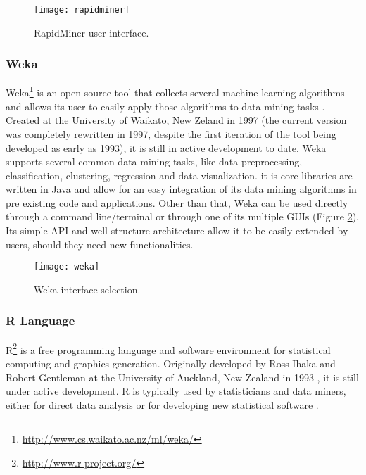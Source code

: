 \begin{figure}[!htb]
  \begin{center}
    \leavevmode
    \texttt{[image: rapidminer]}
    \caption[RapidMiner user interface]{RapidMiner user interface.}
    \label{fig:rapidminer}
  \end{center}
\end{figure}

\subsubsection*{Weka}

Weka\footnote{\url{http://www.cs.waikato.ac.nz/ml/weka/}} is an open source tool that
collects several machine learning algorithms and allows its user to easily apply
those algorithms to data mining tasks \cite{Hall}. Created at the University of
Waikato, New Zeland in 1997 (the current version was completely rewritten in
1997, despite the first iteration of the tool being developed as early as 1993),
it is still in active development to date. Weka supports several common data
mining tasks, like data preprocessing, classification, clustering, regression
and data visualization. it is core libraries are written in Java and allow for an
easy integration of its data mining algorithms in pre existing code and
applications. Other than that, Weka can be used directly through a command
line/terminal or through one of its multiple GUIs (Figure \ref{fig:weka}). Its
simple API and well structure architecture allow it to be easily extended by
users, should they need new functionalities.

\begin{figure}[!htb]
  \begin{center}
    \leavevmode
    \texttt{[image: weka]}
    \caption[Weka interface selection]{Weka interface selection.}
    \label{fig:weka}
  \end{center}
\end{figure}

\subsubsection*{R Language}

R\footnote{\url{http://www.r-project.org/}} is a free programming language and
software environment for statistical computing and graphics generation.
Originally developed by Ross Ihaka and Robert Gentleman at the University of
Auckland, New Zealand in 1993 \cite{Ihaka1998}, it is still under active
development. R is typically used by statisticians and data miners, either for
direct data analysis or for developing new statistical software \cite{Fox2005}.

